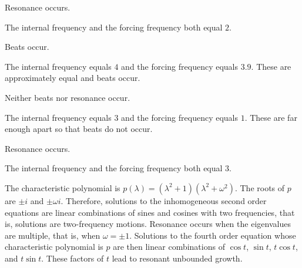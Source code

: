 \documentclass{ximera}
\begin{document}
  \ans Resonance occurs.

\soln  The internal frequency and the forcing frequency both equal $2$.

\newpage
{} \ans Beats occur.

\soln  The internal frequency equals $4$ and the forcing frequency equals
$3.9$.  These are approximately equal and beats occur.

 \ans Neither beats nor resonance occur.

The internal frequency equals $3$ and the forcing frequency equals
$1$. These are far enough apart so that beats do not occur.

 \ans Resonance occurs.

\soln  The internal frequency and the forcing frequency both equal $3$.


The characteristic polynomial is $p(\lambda)=(\lambda^2+1)(\lambda^2+\omega^2)$. 
The roots of $p$ are $\pm i$ and $\pm\omega i$.  Therefore, solutions to the
inhomogeneous second order equations are linear combinations of sines and cosines with
two frequencies, that is, solutions are two-frequency motions.  Resonance occurs
when the eigenvalues are multiple, that is, when $\omega=\pm 1$.  Solutions to the
fourth order equation whose characteristic polynomial is $p$ are then linear
combinations of $\cos t$, $\sin t$, $t\cos t$, and $t\sin t$.  These factors of $t$ 
lead to resonant unbounded growth.
\end{document}
